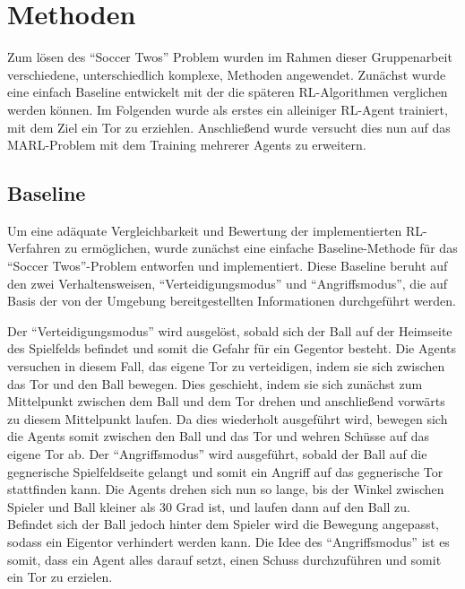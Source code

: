 \chapter{Methoden} \label{chapter:2}

Zum lösen des \enquote{Soccer Twos} Problem wurden im Rahmen dieser Gruppenarbeit verschiedene, unterschiedlich komplexe, Methoden angewendet. Zunächst wurde eine einfach Baseline entwickelt mit der die späteren \ac{RL}-Algorithmen verglichen werden können. Im Folgenden wurde als erstes ein alleiniger \ac{RL}-Agent trainiert, mit dem Ziel ein Tor zu erziehlen. Anschließend wurde versucht dies nun auf das \ac{MARL}-Problem mit dem Training mehrerer Agents zu erweitern.

\section{Baseline}

Um eine adäquate Vergleichbarkeit und Bewertung der implementierten \ac{RL}-Verfahren zu ermöglichen, wurde zunächst eine einfache Baseline-Methode für das \enquote{Soccer Twos}-Problem entworfen und implementiert. Diese Baseline beruht auf den zwei Verhaltensweisen, \enquote{Verteidigungsmodus} und \enquote{Angriffsmodus}, die auf Basis der von der Umgebung bereitgestellten Informationen durchgeführt werden.

Der \enquote{Verteidigungsmodus} wird ausgelöst, sobald sich der Ball auf der Heimseite des Spielfelds befindet und somit die Gefahr für ein Gegentor besteht. Die Agents versuchen in diesem Fall, das eigene Tor zu verteidigen, indem sie sich zwischen das Tor und den Ball bewegen. Dies geschieht, indem sie sich zunächst zum Mittelpunkt zwischen dem Ball und dem Tor drehen und anschließend vorwärts zu diesem Mittelpunkt laufen. Da dies wiederholt ausgeführt wird, bewegen sich die Agents somit zwischen den Ball und das Tor und wehren Schüsse auf das eigene Tor ab.
Der \enquote{Angriffsmodus} wird ausgeführt, sobald der Ball auf die gegnerische Spielfeldseite gelangt und somit ein Angriff auf das gegnerische Tor stattfinden kann. Die Agents drehen sich nun so lange, bis der Winkel zwischen Spieler und Ball kleiner als 30 Grad ist, und laufen dann auf den Ball zu. Befindet sich der Ball jedoch hinter dem Spieler wird die Bewegung angepasst, sodass ein Eigentor verhindert werden kann. Die Idee des \enquote{Angriffsmodus} ist es somit, dass ein Agent alles darauf setzt, einen Schuss durchzuführen und somit ein Tor zu erzielen.

